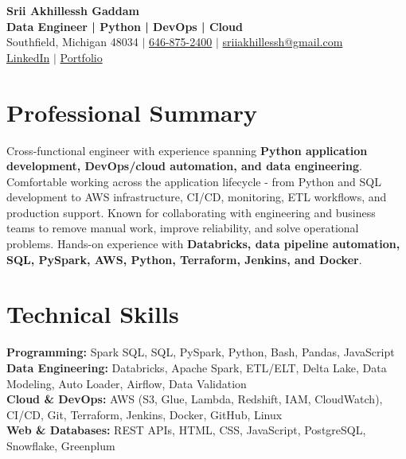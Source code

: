 \documentclass[letterpaper,10pt]{article}
\begin{document}
\fontsize{9.35pt}{10.45pt}\selectfont

\begin{center}
    {\LARGE \textbf{Srii Akhillessh Gaddam}} \\[-1pt]
    \textbf{Data Engineer | Python | DevOps | Cloud} \\[2pt]
    Southfield, Michigan 48034 $|$
    \href{tel:6468752400}{646-875-2400} $|$
    \href{mailto:sriiakhillessh@gmail.com}{sriiakhillessh@gmail.com} \\[1pt]
    \href{https://www.linkedin.com/in/srii-akhiilessh-gaddam-b48668191/}{LinkedIn} $|$
    \href{https://sriiakhillesshg.github.io/portfolio/}{Portfolio}
\end{center}
\vspace{-8pt}

\section{Professional Summary}
\small{Cross-functional engineer with experience spanning \textbf{Python application development, DevOps/cloud automation, and data engineering}. Comfortable working across the application lifecycle - from Python and SQL development to AWS infrastructure, CI/CD, monitoring, ETL workflows, and production support. Known for collaborating with engineering and business teams to remove manual work, improve reliability, and solve operational problems. Hands-on experience with \textbf{Databricks, data pipeline automation, SQL, PySpark, AWS, Python, Terraform, Jenkins, and Docker}.}

\section{Technical Skills}
\small{
\textbf{Programming:} Spark SQL, SQL, PySpark, Python, Bash, Pandas, JavaScript \\
\textbf{Data Engineering:} Databricks, Apache Spark, ETL/ELT, Delta Lake, Data Modeling, Auto Loader, Airflow, Data Validation \\
\textbf{Cloud \& DevOps:} AWS (S3, Glue, Lambda, Redshift, IAM, CloudWatch), CI/CD, Git, Terraform, Jenkins, Docker, GitHub, Linux \\
\textbf{Web \& Databases:} REST APIs, HTML, CSS, JavaScript, PostgreSQL, Snowflake, Greenplum
}

\end{document}
